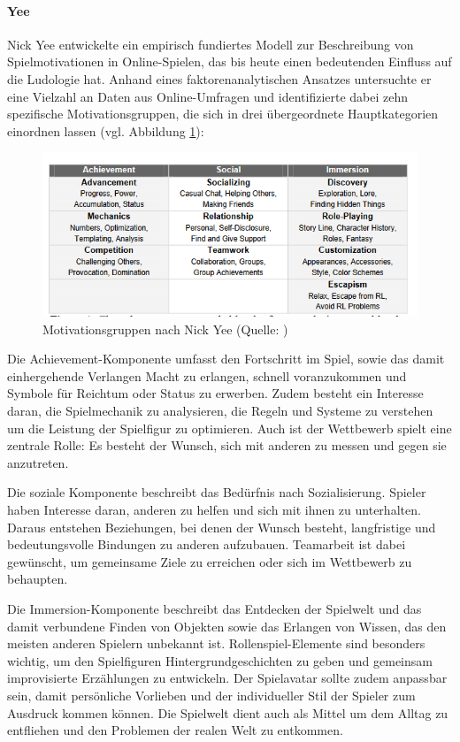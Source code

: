 \paragraph{Yee}
Nick Yee entwickelte ein empirisch fundiertes Modell zur Beschreibung von Spielmotivationen in Online-Spielen, das bis heute einen bedeutenden Einfluss auf die Ludologie hat. Anhand eines faktorenanalytischen Ansatzes untersuchte er eine Vielzahl an Daten aus Online-Umfragen und identifizierte dabei zehn spezifische Motivationsgruppen, die sich in drei übergeordnete Hauptkategorien einordnen lassen (vgl. Abbildung \ref{fig:nick_yee_motivations}):

\begin{figure}[ht]
\centering
\includegraphics[width=1\linewidth]{content/pictures/nick_yee_categorizations.PNG}
\caption{Motivationsgruppen nach Nick Yee (Quelle: \cite{yee_motivations_2006})}
\label{fig:nick_yee_motivations}
\end{figure}

Die Achievement-Komponente umfasst den Fortschritt im Spiel, sowie das damit einhergehende Verlangen Macht zu erlangen, schnell voranzukommen und Symbole für Reichtum oder Status zu erwerben. Zudem besteht ein Interesse daran, die Spielmechanik zu analysieren, die Regeln und Systeme zu verstehen um die Leistung der Spielfigur zu optimieren. Auch ist der Wettbewerb spielt eine zentrale Rolle: Es besteht der Wunsch, sich mit anderen zu messen und gegen sie anzutreten.

Die soziale Komponente beschreibt das Bedürfnis nach Sozialisierung. Spieler haben Interesse daran, anderen zu helfen und sich mit ihnen zu unterhalten. Daraus entstehen Beziehungen, bei denen der Wunsch besteht, langfristige und bedeutungsvolle Bindungen zu anderen aufzubauen. Teamarbeit ist dabei gewünscht, um gemeinsame Ziele zu erreichen oder sich im Wettbewerb zu behaupten.

Die Immersion-Komponente beschreibt das Entdecken der Spielwelt und das damit verbundene Finden von Objekten sowie das Erlangen von Wissen, das den meisten anderen Spielern unbekannt ist. Rollenspiel-Elemente sind besonders wichtig, um den Spielfiguren Hintergrundgeschichten zu geben und gemeinsam improvisierte Erzählungen zu entwickeln. Der Spielavatar sollte zudem anpassbar sein, damit persönliche Vorlieben und der individueller Stil der Spieler zum Ausdruck kommen können. Die Spielwelt dient auch als Mittel um dem Alltag zu entfliehen und den Problemen der realen Welt zu entkommen.

